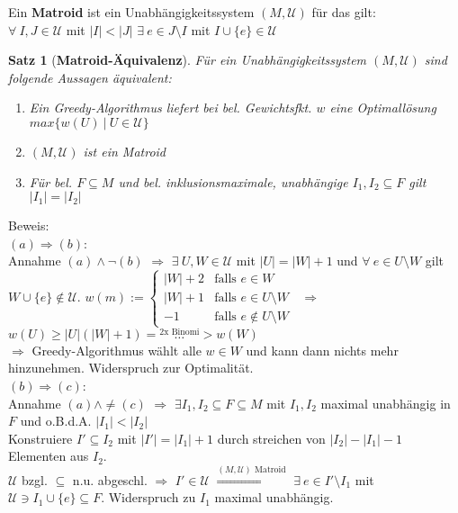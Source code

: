 \documentclass[a4paper,10pt]{scrartcl}
\newcommand{\tbf}{\textbf}
\newcommand{\Ra}{\Rightarrow}
\newcommand{\calU}{\mathcal{U}}
\newtheorem{satz}{Satz}
\begin{document}
Ein \tbf{Matroid} ist ein Unabhängigkeitssystem $(M,\calU)$ für das gilt: \\
$\forall \ I, J \in \calU$ mit $|I| < |J|$ $\exists \ e \in J \setminus I$ mit $I \cup \{e\} \in \calU$ \\

\begin{satz}[\tbf{Matroid-Äquivalenz}]
 Für ein Unabhängigkeitssystem $(M,\calU)$ sind folgende Aussagen äquivalent:
\begin{enumerate}[$(a)$]
 \item Ein Greedy-Algorithmus liefert bei bel. Gewichtsfkt. $w$ eine Optimallösung $max \{ w(U) \ | \ U \in \calU \}$
 \item $(M,\calU)$ ist ein Matroid
 \item Für bel. $F \subseteq M$ und bel. inklusionsmaximale, unabhängige $I_1, I_2 \subseteq F$ gilt $|I_1| = |I_2|$
\end{enumerate}
\end{satz}

Beweis: \\
$(a) \Ra (b)$: \\
Annahme $(a) \land \neg (b)$ $\Ra$ $\exists \ U,W \in \calU$ mit $|U| = |W| + 1$ und $\forall \ e \in U \setminus W$ gilt $W \cup \{e\} \not \in \calU$. $w(m) := \begin{cases} |W| + 2 & \text{falls } e \in W \\ |W| + 1 & \text{falls } e \in U \setminus W \\ -1 & \text{falls } e \not \in U \setminus W \end{cases}$ $\ \Ra \ $ $w(U) \geq |U|(|W| + 1) = \overset{\text{2x Binomi}}{\ldots} > w(W)$ \\
$\Ra$ Greedy-Algorithmus wählt alle $w \in W$ und kann dann nichts mehr hinzunehmen. Widerspruch zur Optimalität. \\

$(b) \Ra (c)$: \\
Annahme $(a) \land \neq (c)$ $\Ra$ $\exists I_1, I_2 \subseteq F \subseteq M$ mit $I_1, I_2$ maximal unabhängig in $F$ und o.B.d.A. $|I_1| < |I_2|$ \\
Konstruiere $I' \subseteq I_2$ mit $|I'| = |I_1| + 1$ durch streichen von $|I_2| - |I_1| - 1$ Elementen aus $I_2$. \\
$\calU$ bzgl. $\subseteq$ n.u. abgeschl. $\Rightarrow$ $I' \in \calU$ $\overset{(M,\calU)  \text{ Matroid}}{\Longrightarrow}$ $\exists \ e \in I' \setminus I_1$ mit $\calU \ni I_1 \cup \{e\} \subseteq F$. Widerspruch zu $I_1$ maximal unabhängig. \\
\end{document}
